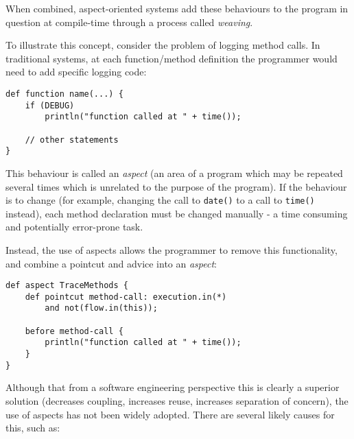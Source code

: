        When combined, aspect-oriented systems add these behaviours to the program in question at compile-time through a process called \textit{weaving}.

        To illustrate this concept, consider the problem of logging method calls. In traditional systems, at each function/method definition the programmer would need to add specific logging code:

        \begin{lstlisting}[caption=Traditional use of advice in programs,label=lst:tradadvice]
def function name(...) {
    if (DEBUG)
        println("function called at " + time());

    // other statements
}\end{lstlisting}

        This behaviour is called an \textit{aspect} (an area of a program which may be repeated several times which is unrelated to the purpose of the program). If the behaviour is to change (\eg for example, changing the call to \texttt{date()} to a call to \texttt{time()} instead), each method declaration must be changed manually - a time consuming and potentially error-prone task.

        Instead, the use of aspects allows the programmer to remove this functionality, and combine a pointcut and advice into an \textit{aspect}:

        \begin{lstlisting}[caption=AOP-based advice equivalent to listing \ref{lst:tradadvice},label=lst:aopadvice]
def aspect TraceMethods {
    def pointcut method-call: execution.in(*)
        and not(flow.in(this));

    before method-call {
        println("function called at " + time());
    }
}\end{lstlisting}

        Although that from a software engineering perspective this is clearly a superior solution (decreases coupling, increases reuse, increases separation of concern), the use of aspects has not been widely adopted. There are several likely causes for this, such as:


